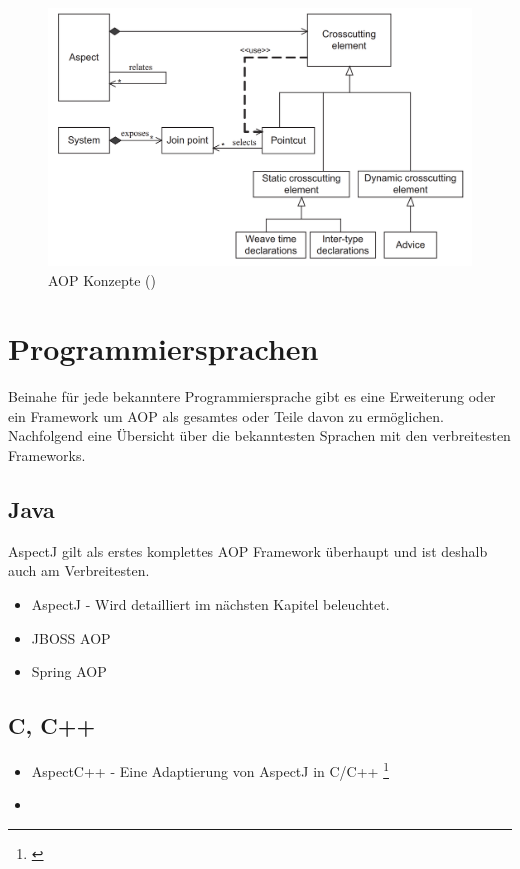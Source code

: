 \begin{figure}[H]
	\centering
		\includegraphics[scale=0.5]{bilder/concepts.png}
	\caption{AOP Konzepte (\cite[p~60]{laddad:aspectj})}
	\label{fig:concepts}
\end{figure}

\section{Programmiersprachen}

Beinahe für jede bekanntere Programmiersprache gibt es eine Erweiterung oder ein Framework um AOP als gesamtes oder Teile davon zu ermöglichen. Nachfolgend eine Übersicht über die bekanntesten Sprachen mit den verbreitesten Frameworks.

\subsection{Java}

AspectJ gilt als erstes komplettes AOP Framework überhaupt und ist deshalb auch am Verbreitesten.

\begin{itemize}
\item AspectJ - Wird detailliert im nächsten Kapitel beleuchtet.
\item JBOSS AOP
\item Spring AOP
\end{itemize}

\subsection{C, C++}

\begin{itemize}
\item AspectC++ - Eine Adaptierung von AspectJ in C/C++ \footnote{\cite{net:apectc}}
\item 
\end{itemize}


